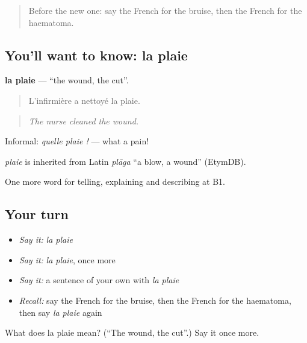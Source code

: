 \label{lesson:FR-C299-plaie}



\begin{quote}
Before the new one: say the French for the bruise, then the French for the haematoma.
\end{quote}

\subsection*{You'll want to know: la plaie}
\textbf{la plaie} — \textquotedblleft{}the wound, the cut\textquotedblright{}.

\begin{quote}
L'infirmière a nettoyé la plaie.
\end{quote}

\begin{quote}
\emph{The nurse cleaned the wound.}
\end{quote}

Informal: \emph{quelle plaie !} — what a pain!

\begin{cousinweb}
\emph{plaie} is inherited from Latin \emph{plāga} \textquotedblleft{}a blow, a wound\textquotedblright{} (EtymDB).
\end{cousinweb}

\begin{grammarlens}[title={What you've built}]
One more word for telling, explaining and describing at B1.
\end{grammarlens}

\subsection*{Your turn}
\begin{itemize}
\raggedright
  \item \emph{Say it:} \emph{la plaie}
  \item \emph{Say it:} \emph{la plaie}, once more
  \item \emph{Say it:} a sentence of your own with \emph{la plaie}
  \item \emph{Recall:} say the French for the bruise, then the French for the haematoma, then say \emph{la plaie} again
\end{itemize}

\begin{tcolorbox}[breakable,colback=teal!4,colframe=teal!35!black,title={Before you move on}]
What does la plaie mean? (\textquotedblleft{}The wound, the cut\textquotedblright{}.) Say it once more.
\end{tcolorbox}
